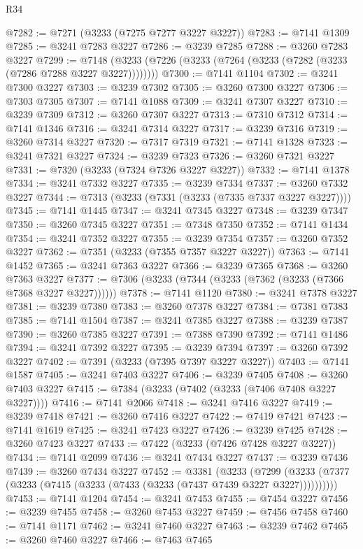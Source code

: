 \begin{lexlean}{R34}
\begin{coremodule}
@7282 := @7271 (@3233 (@7275 @7277 @3227 @3227))
@7283 := @7141 @1309
@7285 := @3241 @7283 @3227
@7286 := @3239 @7285
@7288 := @3260 @7283 @3227
@7299 := @7148 (@3233 (@7226 (@3233 (@7264 (@3233 (@7282 (@3233 (@7286 @7288 @3227 @3227))))))))
@7300 := @7141 @1104
@7302 := @3241 @7300 @3227
@7303 := @3239 @7302
@7305 := @3260 @7300 @3227
@7306 := @7303 @7305
@7307 := @7141 @1088
@7309 := @3241 @7307 @3227
@7310 := @3239 @7309
@7312 := @3260 @7307 @3227
@7313 := @7310 @7312
@7314 := @7141 @1346
@7316 := @3241 @7314 @3227
@7317 := @3239 @7316
@7319 := @3260 @7314 @3227
@7320 := @7317 @7319
@7321 := @7141 @1328
@7323 := @3241 @7321 @3227
@7324 := @3239 @7323
@7326 := @3260 @7321 @3227
@7331 := @7320 (@3233 (@7324 @7326 @3227 @3227))
@7332 := @7141 @1378
@7334 := @3241 @7332 @3227
@7335 := @3239 @7334
@7337 := @3260 @7332 @3227
@7344 := @7313 (@3233 (@7331 (@3233 (@7335 @7337 @3227 @3227))))
@7345 := @7141 @1445
@7347 := @3241 @7345 @3227
@7348 := @3239 @7347
@7350 := @3260 @7345 @3227
@7351 := @7348 @7350
@7352 := @7141 @1434
@7354 := @3241 @7352 @3227
@7355 := @3239 @7354
@7357 := @3260 @7352 @3227
@7362 := @7351 (@3233 (@7355 @7357 @3227 @3227))
@7363 := @7141 @1452
@7365 := @3241 @7363 @3227
@7366 := @3239 @7365
@7368 := @3260 @7363 @3227
@7377 := @7306 (@3233 (@7344 (@3233 (@7362 (@3233 (@7366 @7368 @3227 @3227))))))
@7378 := @7141 @1120
@7380 := @3241 @7378 @3227
@7381 := @3239 @7380
@7383 := @3260 @7378 @3227
@7384 := @7381 @7383
@7385 := @7141 @1504
@7387 := @3241 @7385 @3227
@7388 := @3239 @7387
@7390 := @3260 @7385 @3227
@7391 := @7388 @7390
@7392 := @7141 @1486
@7394 := @3241 @7392 @3227
@7395 := @3239 @7394
@7397 := @3260 @7392 @3227
@7402 := @7391 (@3233 (@7395 @7397 @3227 @3227))
@7403 := @7141 @1587
@7405 := @3241 @7403 @3227
@7406 := @3239 @7405
@7408 := @3260 @7403 @3227
@7415 := @7384 (@3233 (@7402 (@3233 (@7406 @7408 @3227 @3227))))
@7416 := @7141 @2066
@7418 := @3241 @7416 @3227
@7419 := @3239 @7418
@7421 := @3260 @7416 @3227
@7422 := @7419 @7421
@7423 := @7141 @1619
@7425 := @3241 @7423 @3227
@7426 := @3239 @7425
@7428 := @3260 @7423 @3227
@7433 := @7422 (@3233 (@7426 @7428 @3227 @3227))
@7434 := @7141 @2099
@7436 := @3241 @7434 @3227
@7437 := @3239 @7436
@7439 := @3260 @7434 @3227
@7452 := @3381
    (@3233
      (@7299 (@3233 (@7377 (@3233 (@7415 (@3233 (@7433 (@3233 (@7437 @7439 @3227 @3227))))))))))
@7453 := @7141 @1204
@7454 := @3241 @7453
@7455 := @7454 @3227
@7456 := @3239 @7455
@7458 := @3260 @7453 @3227
@7459 := @7456 @7458
@7460 := @7141 @1171
@7462 := @3241 @7460 @3227
@7463 := @3239 @7462
@7465 := @3260 @7460 @3227
@7466 := @7463 @7465

\end{coremodule}
\end{lexlean}
